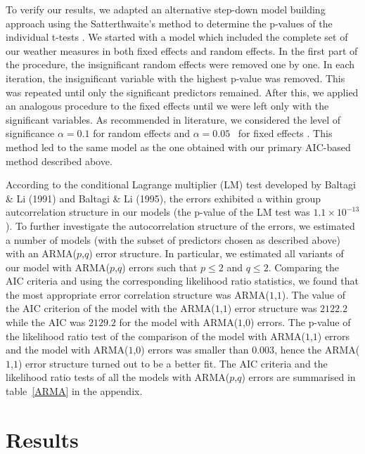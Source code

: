 \documentclass[12pt]{iopart}
\begin{document}
To verify our results, we adapted an alternative step-down model building
approach using the Satterthwaite’s method to determine the p-values of the individual
t-tests \cite{lmerTest}. We started with a model which included the complete set of our weather measures in both fixed effects and random effects. In the first part of the procedure, the insignificant random effects were removed one by one. In each iteration, the insignificant variable with the highest p-value was removed. This was repeated until only the significant predictors remained. After this, we applied an analogous procedure to the fixed effects until we were left only with the significant variables. As recommended in literature, we considered the level of significance $\alpha=0.1$ for random effects and $\alpha=0.05$~ for fixed effects \cite{lmerTest}. This method led to the same model as the one obtained with our primary AIC-based method described above.


According to the conditional Lagrange multiplier (LM) test developed by Baltagi \& Li (1991) and Baltagi \& Li (1995), the errors exhibited a within group autcorrelation structure in our models (the p-value of the LM test was $1.1\times10^{-13}$). To further investigate the autocorrelation structure of the errors, we estimated a number of models (with the subset of predictors chosen as described above) with an ARMA($p$,$q$) error structure. In particular, we estimated all variants of our model with ARMA($p$,$q$) errors such that $p\leq2$ and $q\leq2$. Comparing the AIC criteria and using the corresponding likelihood ratio statistics, we found that the most appropriate error correlation structure was ARMA($1$,$1$). The value of the AIC criterion of the model with the ARMA($1$,$1$) error structure was $2122.2$ while the AIC was $2129.2$ for the model with ARMA($1$,$0$) errors.  The p-value of the likelihood ratio test of the comparison of the model with ARMA($1$,$1$) errors and the model with ARMA($1$,$0$) errors was smaller than $0.003$, hence the ARMA($1$,$1$) error structure turned out to be a better fit. The AIC criteria and the likelihood ratio tests of all the models with ARMA($p$,$q$) errors are summarised in table~\ref{ARMA} in the appendix.

	\section{Results}\label{Results}
	
\end{document}
